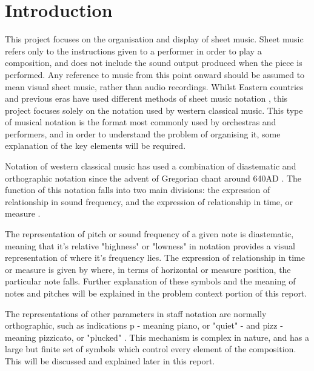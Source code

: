 \section{Introduction}
This project focuses on the organisation and display of sheet music. Sheet music refers only to the instructions given to a performer in order to play a composition, and does not include the sound output produced when the piece is performed. Any reference to music from this point onward should be assumed to mean visual sheet music, rather than audio recordings.
Whilst Eastern countries and previous eras have used different methods of sheet music notation \parencite{Kaufman}, this project focuses solely on the notation used by western classical music. This type of musical notation is the format most commonly used by orchestras and performers, and in order to understand the problem of organising it, some explanation of the key elements will be required.

Notation of western classical music has used a combination of diastematic and orthographic notation \parencite{RRastall} since the advent of Gregorian chant around 640AD \parencite{RTaruskin}. The function of this notation falls into two main divisions: the expression of relationship in sound frequency, and the expression of relationship in time, or measure \parencite{oxHistory}.

The representation of pitch or sound frequency of a given note is diastematic, meaning that it's relative "highness" or "lowness" in notation provides a visual representation of where it's frequency lies. The expression of relationship in time or measure is given by where, in terms of horizontal or measure position, the particular note falls. Further explanation of these symbols and the meaning of notes and pitches will be explained in the problem context portion of this report.

The representations of other parameters in staff notation are normally orthographic, such as indications p - meaning piano, or "quiet" - and pizz - meaning pizzicato, or "plucked" \parencite{RRastall}. This mechanism is complex in nature, and has a large but finite set of symbols which control every element of the composition. This will be discussed and explained later in this report.

